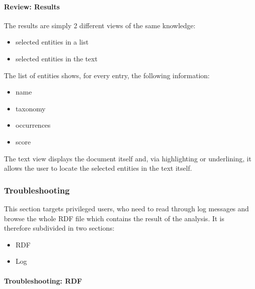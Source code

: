 \documentclass[12pt,svgnames]{memoir}
\begin{document}
\paragraph*{Review: Results}\label{review-results}

The results are simply 2 different views of the same knowledge:

\begin{itemize}
\itemsep1pt\parskip0pt
\item
  selected entities in a list
\item
  selected entities in the text
\end{itemize}

The list of entities shows, for every entry, the following information:

\begin{itemize}
\itemsep1pt\parskip0pt
\item
  name
\item
  taxonomy
\item
  occurrences
\item
  score
\end{itemize}

The text view displays the document itself and, via highlighting or
underlining, it allows the user to locate the selected entities in the
text itself.

\subsubsection*{Troubleshooting}\label{troubleshooting}

This section targets privileged users, who need to read through log
messages and browse the whole RDF file which contains the result of the
analysis. It is therefore subdivided in two sections:

\begin{itemize}
\itemsep1pt\parskip0pt
\item
  RDF
\item
  Log
\end{itemize}

\paragraph*{Troubleshooting: RDF}\label{troubleshooting-rdf}
\end{document}
